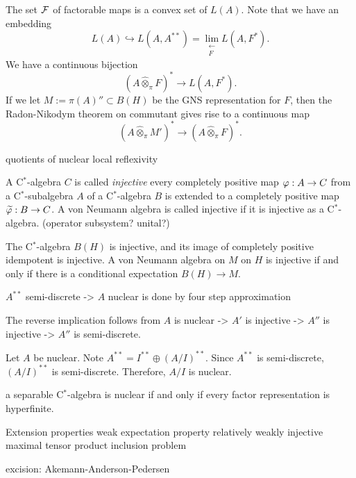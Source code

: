 \documentclass{../../large}
\begin{document}
The set $\mathcal{F}$ of factorable maps is a convex set of $L(A)$.
Note that we have an embedding
\[L(A)\hookrightarrow L(A,A^{**})=\lim_{\substack{\longleftarrow\\F}}L(A,F^*).\]
We have a continuous bijection
\[(A\hat\otimes_\pi F)^*\to L(A,F^*).\]
If we let $M:=\pi(A)''\subset B(H)$ be the GNS representation for $F$, then the Radon-Nikodym theorem on commutant gives rise to a continuous map
\[(A\mathrel{\hat\otimes}_\pi M')^*\to(A\mathrel{\hat\otimes}_\pi F)^*.\]




quotients of nuclear
local reflexivity



\begin{prb}
A C$^*$-algebra $C$ is called \emph{injective} every completely positive map $\varphi:A\to C$ from a C$^*$-subalgebra $A$ of a C$^*$-algebra $B$ is extended to a completely positive map $\widetilde{\varphi}:B\to C$.
A von Neumann algebra is called injective if it is injective as a C$^*$-algebra.
(operator subsystem? unital?)

The C$^*$-algebra $B(H)$ is injective, and its image of completely positive idempotent is injective.
A von Neumann algebra on $M$ on $H$ is injective if and only if there is a conditional expectation $B(H)\to M$.

\end{prb}



$A^{**}$ semi-discrete -> $A$ nuclear is done by four step approximation

The reverse implication follows from $A$ is nuclear -> $A'$ is injective -> $A''$ is injective -> $A''$ is semi-discrete.


Let $A$ be nuclear.
Note $A^{**}=I^{**}\oplus(A/I)^{**}$.
Since $A^{**}$ is semi-discrete, $(A/I)^{**}$ is semi-discrete.
Therefore, $A/I$ is nuclear.








a separable C$^*$-algebra is nuclear if and only if every factor representation is hyperfinite.

Extension properties
weak expectation property
relatively weakly injective
maximal tensor product inclusion problem



excision: Akemann-Anderson-Pedersen
\end{document}
